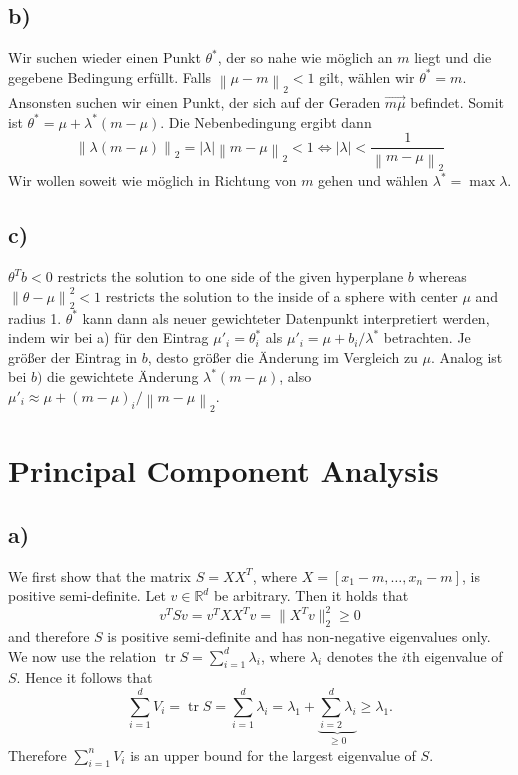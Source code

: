 \documentclass[paper=a4,fontsize=10pt,DIV11,BCOR10mm]{scrartcl}
\newcommand{\abs}[1]{\left\lvert#1\right\rvert}
\newcommand{\norm}[1]{\left\lVert#1\right\rVert}
\DeclareMathOperator{\tr}{tr}
\begin{document}
\subsection*{b)}

Wir suchen wieder einen Punkt $\theta^*$, der so nahe wie möglich an $m$ liegt und die gegebene Bedingung erfüllt. Falls $\norm{\mu - m}_2 < 1$ gilt, wählen wir $\theta^* = m$. Ansonsten suchen wir einen Punkt, der sich auf der Geraden $\overrightarrow{m \mu}$ befindet. Somit ist $\theta^* = \mu + \lambda^* (m - \mu)$. Die Nebenbedingung ergibt dann
\[ \norm{\lambda (m - \mu)}_2 = \abs{\lambda} \norm{m - \mu}_2 < 1 \Leftrightarrow \abs{\lambda} < \frac{1}{\norm{m - \mu}_2} \]
Wir wollen soweit wie möglich in Richtung von $m$ gehen und wählen $\lambda^* = \max \lambda$.



\subsection*{c)}

$\theta^T b < 0$ restricts the solution to one side of the given hyperplane $b$ whereas $\norm{\theta - \mu}_2^2 < 1$ restricts the solution to the inside of a sphere with center $\mu$ and radius 1. $\theta^*$ kann dann als neuer gewichteter Datenpunkt interpretiert werden, indem wir bei a) für den Eintrag $\mu'_i = \theta^*_i$ als $\mu'_i = \mu + b_i / \lambda^*$ betrachten. Je größer der Eintrag in $b$, desto größer die Änderung im Vergleich zu $\mu$. Analog ist bei $b)$ die gewichtete Änderung $\lambda^* (m - \mu)$, also $\mu'_i \approx \mu + (m - \mu)_i / \norm{m - \mu}_2$.





\section{Principal Component Analysis}

\subsection*{a)}

We first show that the matrix $S=XX^T$, where $X=[x_1-m,\dots, x_n-m]$,  is positive semi-definite. Let $v \in \mathbb{R}^d$ be arbitrary. Then it holds that
\begin{equation*}
v^TSv=v^TXX^Tv=\lVert X^Tv\rVert_2^2 \geq 0
\end{equation*}
and therefore $S$ is positive semi-definite and has non-negative eigenvalues only.
We now use the relation $\tr S=\sum_{i=1}^d \lambda_i$, where $\lambda_i$ denotes the $i$th eigenvalue of $S$.
Hence it follows that
\begin{equation}\label{glg1}
\sum_{i=1}^d V_i=\tr S=\sum_{i=1}^d \lambda_i= \lambda_1 + \underbrace{\sum_{i=2}^d \lambda_i}_{\geq 0} \geq \lambda_1\text{.}
\end{equation}
Therefore $\sum_{i=1}^n V_i$ is an upper bound for the largest eigenvalue of $S$.
\end{document}
